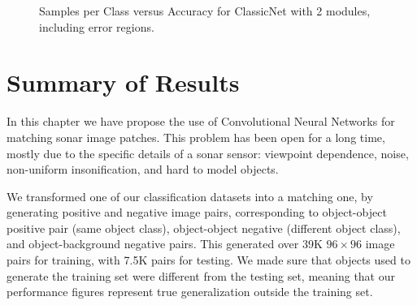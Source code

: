 \begin{figure}[!ht]
{
	}
	\vspace*{0.5cm}
	\caption[Samples per Class versus Accuracy for ClassicNet with 2 modules]{Samples per Class versus Accuracy for ClassicNet with 2 modules, including error regions.}
	\label{mat:spcVsAUC}
\end{figure}

\FloatBarrier

\newpage
\section{Summary of Results}

In this chapter we have propose the use of Convolutional Neural Networks for matching sonar image patches. This problem has been open for a long time, mostly due to the specific details of a sonar sensor: viewpoint dependence, noise, non-uniform insonification, and hard to model objects.

We transformed one of our classification datasets into a matching one, by generating positive and negative image pairs, corresponding to object-object positive pair (same object class), object-object negative (different object class), and object-background negative pairs. This generated over 39K $96 \times 96$ image pairs for training, with 7.5K pairs for testing. We made sure that objects used to generate the training set were different from the testing set, meaning that our performance figures represent true generalization outside the training set.

